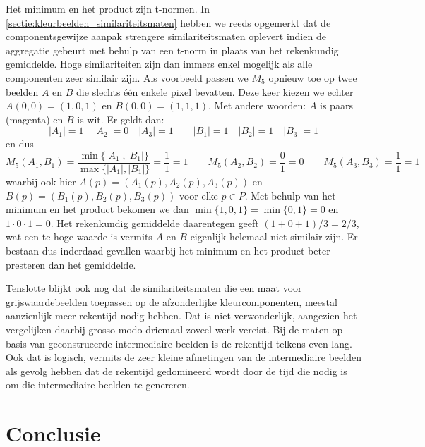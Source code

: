 Het minimum en het product zijn t-normen.
In \ref{sectie:kleurbeelden_similariteitsmaten} hebben we reeds opgemerkt dat de 
componentsgewijze aanpak strengere similariteitsmaten oplevert indien de
aggregatie gebeurt met behulp van een t-norm in plaats van het rekenkundig gemiddelde. 
Hoge similariteiten zijn dan immers enkel mogelijk als alle componenten
zeer similair zijn. Als voorbeeld passen we
$M_5$ opnieuw toe op twee beelden $A$ en $B$ die slechts \'e\'en enkele pixel bevatten. Deze
keer kiezen we echter $A(0,0)=(1,0,1)$ en $B(0,0)=(1,1,1)$. Met andere woorden: $A$ is paars 
(magenta) en $B$ is wit. Er geldt dan:
\begin{displaymath}
|A_1|=1 \quad |A_2|=0 \quad |A_3|=1 \qquad |B_1|=1 \quad |B_2|=1 \quad |B_3|=1
\end{displaymath}
en dus
\begin{displaymath}
M_5(A_1,B_1)=\frac{\min\{|A_1|,|B_1|\}}{\max\{|A_1|,|B_1|\}}=\frac{1}{1}=1 \qquad 
M_5(A_2,B_2)=\frac{0}{1}=0 \qquad M_5(A_3,B_3)=\frac{1}{1}=1
\end{displaymath}
waarbij ook hier $A(p)=(A_1(p),A_2(p),A_3(p))$ en $B(p)=(B_1(p),B_2(p),B_3(p))$ voor elke $p \in P$.
Met behulp van het minimum en het product bekomen we dan $\min\{1,0,1\}=\min\{0,1\}=0$
en $1 \cdot 0 \cdot 1 = 0$. Het rekenkundig gemiddelde daarentegen geeft $(1+0+1)/3=2/3$, wat
een te hoge waarde is vermits $A$ en $B$ eigenlijk helemaal niet similair zijn.
Er bestaan dus inderdaad gevallen waarbij het minimum en het product beter presteren dan 
het gemiddelde.

Tenslotte blijkt ook nog dat de similariteitsmaten die een maat voor grijswaardebeelden 
toepassen op de afzonderlijke kleurcomponenten, meestal aanzienlijk meer rekentijd nodig hebben. 
Dat is niet verwonderlijk, aangezien het vergelijken daarbij grosso modo driemaal zoveel werk vereist.
Bij de maten op basis van geconstrueerde intermediaire beelden is de rekentijd telkens even
lang. Ook dat is logisch, vermits de zeer kleine afmetingen van de intermediaire beelden als
gevolg hebben dat de rekentijd gedomineerd wordt door de tijd die nodig is om die 
intermediaire beelden te genereren.

\section{Conclusie}

